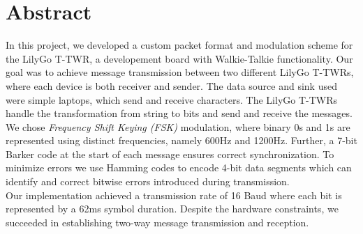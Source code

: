 \chapter{Abstract}
In this project, we developed a custom packet format and modulation scheme for the LilyGo T-TWR, a developement board with Walkie-Talkie functionality. Our goal was to achieve message transmission between two different LilyGo T-TWRs, where each device is both receiver and sender. The data source and sink used were simple laptops, which send and receive characters. The LilyGo T-TWRs handle the transformation from string to bits and send and receive the messages. %
\\
We chose \textit{Frequency Shift Keying (FSK)} modulation, where binary 0s and 1s are represented using distinct frequencies, namely 600Hz and 1200Hz. Further, a 7-bit Barker code at the start of each message ensures correct synchronization. To minimize errors we use Hamming codes to encode 4-bit data segments which can identify and correct bitwise errors introduced during transmission. 
\\
Our implementation achieved a transmission rate of 16 Baud where each bit is represented by a 62ms symbol duration. Despite the hardware constraints, we succeeded in establishing two-way message transmission and reception.